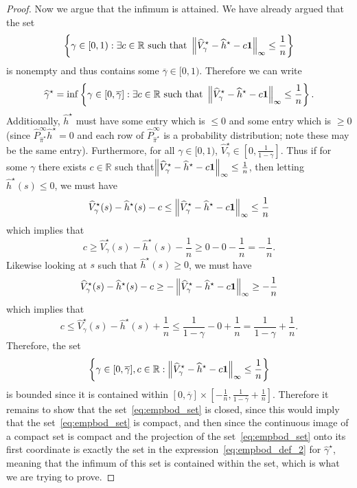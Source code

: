 \documentclass{article}
\theoremstyle{plain}
\theoremstyle{plain}
\theoremstyle{remark}
\theoremstyle{plain}
\theoremstyle{plain}
\newcommand{\R}{\mathbb{R}}
\newcommand{\Phat}{\widehat{P}}
\newcommand{\Vhat}{\widehat{V}}
\newcommand{\pihstar}{\widehat{\pi}^\star}
\newcommand{\one}{\mathbf{1}}
\newcommand{\hhat}{\widehat{h}}
\newcommand{\empbod}{\widehat{\gamma}^\star}
\begin{document}
\begin{proof}
        Now we argue that the infimum is attained. We have already argued that the set
        \[
            \left \{\gamma \in [0, 1) : \exists c \in \R \text{ such that }\infnorm{\Vhat^\star_{\gamma} - \hhat^\star - c\one} \leq \frac{1}{n} \right \}
        \]
        is nonempty and thus contains some $\overline{\gamma} \in [0, 1)$. Therefore we can write
        \begin{align}
            \empbod = \inf \left \{\gamma \in [0, \overline{\gamma}] : \exists c \in \R \text{ such that }\infnorm{\Vhat^\star_{\gamma} - \hhat^\star - c\one} \leq \frac{1}{n} \right \}. \label{eq:empbod_def_2}
        \end{align}
        Additionally, $\hhat^\star$ must have some entry which is $\leq 0$ and some entry which is $\geq 0$ (since $\Phat^\infty_{\pihstar} \hhat^\star = 0$ and each row of $\Phat^\infty_{\pihstar}$ is a probability distribution; note these may be the same entry). Furthermore, for all $\gamma \in [0, 1)$, $\Vhat_\gamma^\star \in [0, \frac{1}{1-\gamma}]$. Thus if for some $\gamma$ there exists $c \in \R$ such that$\infnorm{\Vhat^\star_{\gamma} - \hhat^\star - c\one} \leq \frac{1}{n}$, then letting $\hhat^\star(s)\leq 0$, we must have
        \[
            \Vhat_\gamma^\star(s) - \hhat^\star(s) - c \leq \infnorm{\Vhat^\star_{\gamma} - \hhat^\star - c\one} \leq \frac{1}{n}
        \]
        which implies that
        \[
            c \geq \Vhat^\star_\gamma(s) - \hhat^\star(s) - \frac{1}{n} \geq 0 - 0 - \frac{1}{n} = -\frac{1}{n}.
        \]
        Likewise looking at $s$ such that $\hhat^\star(s) \geq 0$, we must have
        \[
            \Vhat_\gamma^\star(s) - \hhat^\star(s) - c \geq -\infnorm{\Vhat^\star_{\gamma} - \hhat^\star - c\one} \geq -\frac{1}{n}
        \]
        which implies that
        \[
            c \leq \Vhat^\star_\gamma(s) - \hhat^\star(s) + \frac{1}{n} \leq \frac{1}{1-\gamma} - 0 + \frac{1}{n} = \frac{1}{1-\gamma} + \frac{1}{n}.
        \]
        Therefore, the set
        \begin{align}
            \left\{ \gamma \in [0, \overline{\gamma}], c \in \R : \infnorm{\Vhat^\star_{\gamma} - \hhat^\star - c\one} \leq \frac{1}{n} \right\} \label{eq:empbod_set}
        \end{align}
        is bounded since it is contained within $[0, \overline{\gamma}] \times \left[-\frac{1}{n}, \frac{1}{1-\overline{\gamma}} + \frac{1}{n}\right]$. Therefore it remains to show that the set~\eqref{eq:empbod_set} is closed, since this would imply that the set~\eqref{eq:empbod_set} is compact, and then since the continuous image of a compact set is compact and the projection of the set~\eqref{eq:empbod_set} onto its first coordinate is exactly the set in the expression~\eqref{eq:empbod_def_2} for $\empbod$, meaning that the infimum of this set is contained within the set, which is what we are trying to prove.


\end{proof}
\end{document}
